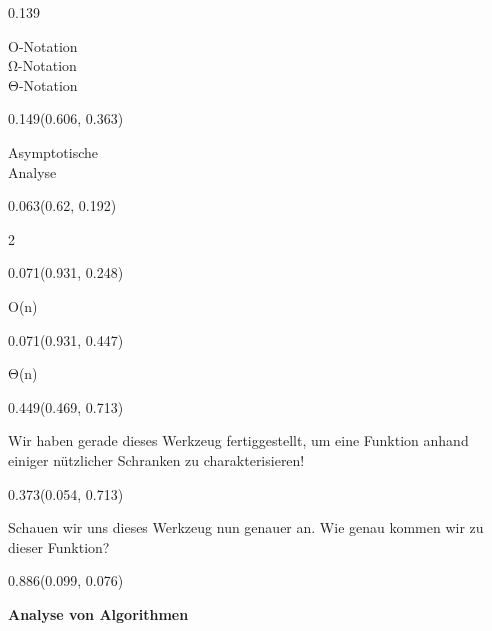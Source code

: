 \documentclass[aspectratio=169]{beamer}
\begin{document}
\begin{frame}[fragile]
\begin{textblock}{0.139}
  \begin{minipage}[t][0.161\paperheight]{\linewidth}
    O-Notation\\Ω-Notation\\Θ-Notation
  \end{minipage}
\end{textblock}
\begin{textblock}{0.149}(0.606, 0.363)
  \begin{minipage}[t][0.103\paperheight]{\linewidth}
    Asymptotische\\Analyse
  \end{minipage}
\end{textblock}
\begin{textblock}{0.063}(0.62, 0.192)
  \begin{minipage}[t][0.111\paperheight]{\linewidth}
    2
  \end{minipage}
\end{textblock}
\begin{textblock}{0.071}(0.931, 0.248)
  \begin{minipage}[t][0.067\paperheight]{\linewidth}
    O(n)
  \end{minipage}
\end{textblock}
\begin{textblock}{0.071}(0.931, 0.447)
  \begin{minipage}[t][0.067\paperheight]{\linewidth}
    Θ(n)
  \end{minipage}
\end{textblock}
\begin{textblock}{0.449}(0.469, 0.713)
  \begin{minipage}[t][0.135\paperheight]{\linewidth}
    Wir haben gerade dieses Werkzeug fertiggestellt, um eine Funktion anhand einiger nützlicher Schranken zu charakterisieren!
  \end{minipage}
\end{textblock}
\begin{textblock}{0.373}(0.054, 0.713)
  \begin{minipage}[t][0.135\paperheight]{\linewidth}
    Schauen wir uns dieses Werkzeug nun genauer an. Wie genau kommen wir zu dieser Funktion?
  \end{minipage}
\end{textblock}
\begin{textblock}{0.886}(0.099, 0.076)
  \begin{minipage}[t][0.131\paperheight]{\linewidth}
    \textbf{Analyse von Algorithmen}
  \end{minipage}

\end{textblock}
\end{frame}
\end{document}
